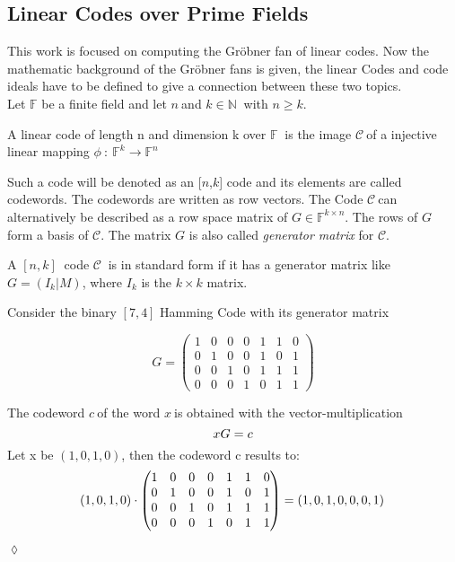    

\newpage

\subsection{Linear Codes over Prime Fields}
\label{subsec:linearcodes}
This work is focused on computing the Gröbner fan of linear codes. Now the mathematic background of the Gröbner fans is given, the linear Codes and code ideals have to be defined to give a connection between these two topics.\\ 
Let $\mathbb{F}$ be a finite field and let $n~$and $k\in \mathbb{N}~$ with $n\geq k$.
\begin{env_definition}
\cite{dueckjournal} A linear code of length n and dimension k over $\mathbb{F}~$ is the image $\mathcal{C}~$of a injective linear mapping $\phi~:~\mathbb{F}^{k} \rightarrow \mathbb{F}^{n}$
\end{env_definition} 
Such a code will be denoted as an [$n$,$k$] code and its elements are called codewords. The codewords are written 
as row vectors. The Code $\mathcal{C}~$can alternatively be described as a row space matrix of $G \in \mathbb{F}^{k \times n}$. The rows of $G$ form a basis of $\mathcal{C}$.
The matrix $G$ is also called \textit{generator matrix} for $\mathcal{C}$.
\begin{env_definition}
\cite{dueckjournal}
A $[n,k]~$ code $\mathcal{C}~$ is in standard form if it has a generator matrix like $G = (I_{k}| M)$, where $I_{k}$ is the $k \times k$ matrix.
\end{env_definition}


\begin{env_example}\normalfont
Consider the binary $[7,4]$ Hamming Code with its generator matrix

\[
G =
\begin{pmatrix}
1 & 0 & 0 & 0 & 1 & 1 & 0 \\ 
0 & 1 & 0 & 0 & 1 & 0 & 1 \\  
0 & 0 & 1 & 0 & 1 & 1 & 1 \\ 
0 & 0 & 0 & 1 & 0 & 1 & 1
\end{pmatrix} 
\]

The codeword $c~$of the word $x~$is obtained with the vector-multiplication
\[
     xG = c \\
 \]
 Let x be $\left(1,0,1,0\right)$, then the codeword c results to:
 \[
      \left(1,0,1,0\right) \cdot \begin{pmatrix}
      1 & 0 & 0 & 0 & 1 & 1 & 0 \\ 
      0 & 1 & 0 & 0 & 1 & 0 & 1 \\  
      0 & 0 & 1 & 0 & 1 & 1 & 1 \\ 
      0 & 0 & 0 & 1 & 0 & 1 & 1
      \end{pmatrix}   = \left(1,0,1,0,0,0,1\right) \\
  \]
\begin{flushright}
$\lozenge$
\end{flushright} 

\end{env_example}


